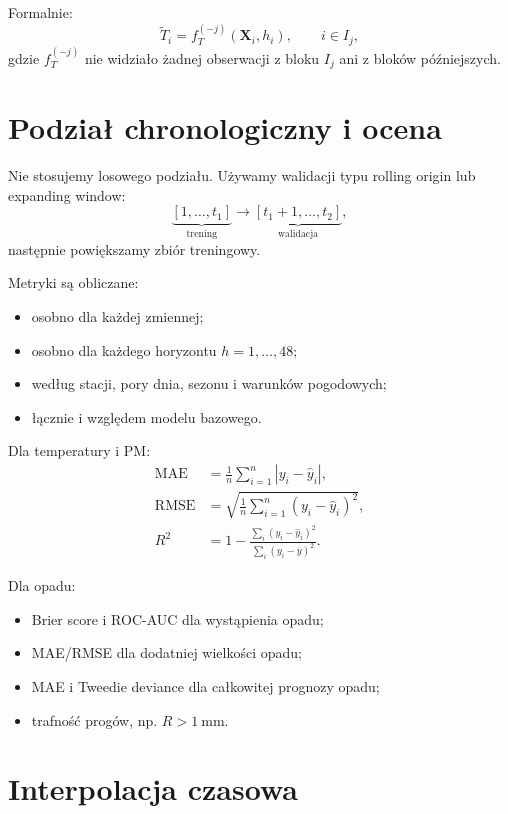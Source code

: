 \documentclass[11pt,a4paper,oneside]{article}
\newcommand{\X}{\mathbf{X}}
\begin{document}
Formalnie:
\begin{equation}
  \widetilde T_i =
  f_T^{(-j)}(\X_i,h_i),\qquad i\in I_j,
\end{equation}
gdzie $f_T^{(-j)}$ nie widziało żadnej obserwacji z bloku $I_j$ ani z bloków
późniejszych.

\section{Podział chronologiczny i ocena}

Nie stosujemy losowego podziału. Używamy walidacji typu rolling origin lub
expanding window:
\[
  \underbrace{[1,\ldots,t_1]}_{\text{trening}}
  \rightarrow
  \underbrace{[t_1+1,\ldots,t_2]}_{\text{walidacja}},
\]
następnie powiększamy zbiór treningowy.

Metryki są obliczane:
\begin{itemize}[nosep]
  \item osobno dla każdej zmiennej;
  \item osobno dla każdego horyzontu $h=1,\ldots,48$;
  \item według stacji, pory dnia, sezonu i warunków pogodowych;
  \item łącznie i względem modelu bazowego.
\end{itemize}

Dla temperatury i PM:
\begin{align}
  \operatorname{MAE} &=
  \frac{1}{n}\sum_{i=1}^{n}|y_i-\widehat y_i|,\\
  \operatorname{RMSE} &=
  \sqrt{\frac{1}{n}\sum_{i=1}^{n}(y_i-\widehat y_i)^2},\\
  R^2 &=1-\frac{\sum_i(y_i-\widehat y_i)^2}
                   {\sum_i(y_i-\overline y)^2}.
\end{align}

Dla opadu:
\begin{itemize}[nosep]
  \item Brier score i ROC-AUC dla wystąpienia opadu;
  \item MAE/RMSE dla dodatniej wielkości opadu;
  \item MAE i Tweedie deviance dla całkowitej prognozy opadu;
  \item trafność progów, np. $R>\SI{1}{\milli\meter}$.
\end{itemize}

\section{Interpolacja czasowa}
\end{document}
